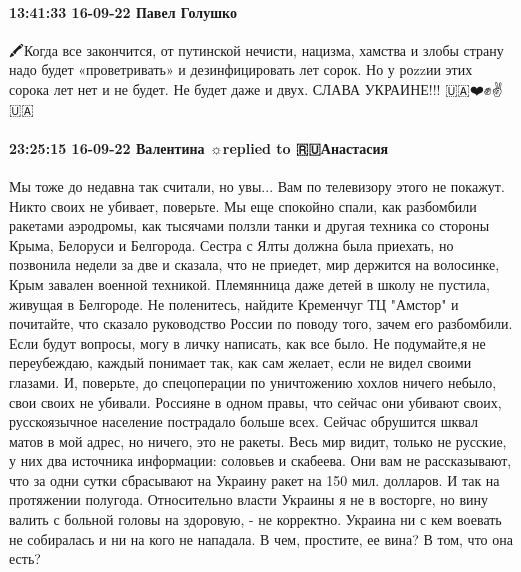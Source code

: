 \paragraph{13:41:33 16-09-22 Павел Голушко}

🖍Когда все закончится, от путинской нечисти, нацизма, хамства и злобы страну надо будет «проветривать» и дезинфицировать лет сорок. Но у роzzии этих сорока лет нет и не будет. Не будет даже и двух.
СЛАВА УКРАИНЕ!!!
🇺🇦❤️✊✌️🇺🇦

\paragraph{23:25:15 16-09-22 Валентина ☼replied to 🇷🇺Анастасия}

Мы тоже до недавна так считали, но увы... Вам по телевизору этого не покажут.
Никто своих не убивает, поверьте. Мы еще спокойно спали, как разбомбили
ракетами аэродромы, как тысячами ползли танки и другая техника со стороны
Крыма, Белоруси и Белгорода. Сестра с Ялты должна была приехать, но позвонила
недели за две и сказала, что не приедет, мир держится на волосинке, Крым
завален военной техникой. Племянница даже детей в школу не пустила, живущая в
Белгороде. Не поленитесь, найдите Кременчуг ТЦ "Амстор" и почитайте, что
сказало руководство России по поводу того, зачем его разбомбили. Если будут
вопросы, могу в личку написать, как все было. Не подумайте,я не переубеждаю,
каждый понимает так, как сам желает, если не видел своими глазами. И, поверьте,
до спецоперации по уничтожению хохлов ничего небыло, свои своих не убивали.
Россияне в одном правы, что сейчас они убивают своих, русскоязычное население
пострадало больше всех. Сейчас обрушится шквал матов в мой адрес, но ничего,
это не ракеты. Весь мир видит, только не русские, у них два источника
информации: соловьев и скабеева. Они вам не рассказывают, что за одни сутки
сбрасывают на Украину ракет на 150 мил. долларов. И так на протяжении полугода.
Относительно власти Украины я не в восторге, но вину валить с больной головы на
здоровую, - не корректно. Украина ни с кем воевать не собиралась и ни на кого
не нападала. В чем, простите, ее вина? В том, что она есть?

